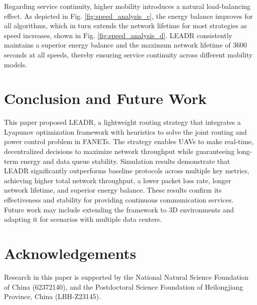 \documentclass[runningheads]{llncs}
\begin{document}
Regarding service continuity, higher mobility introduces a natural load-balancing effect.  As depicted in Fig. \ref{fig:speed_analysis_c}, the energy balance improves for all algorithms, which in turn extends the network lifetime for most strategies as speed increases, shown in Fig. \ref{fig:speed_analysis_d}. LEADR consistently maintains a superior energy balance and the maximum network lifetime of 3600 seconds at all speeds, thereby ensuring service continuity across different mobility models.

\section{Conclusion and Future Work}
\label{s6}
This paper proposed LEADR, a lightweight routing strategy that integrates a Lyapunov optimization framework with heuristics to solve the joint routing and power control problem in FANETs. The strategy enables UAVs to make real-time, decentralized decisions to maximize network throughput while guaranteeing long-term energy and data queue stability. Simulation results demonstrate that LEADR significantly outperforms baseline protocols across multiple key metrics, achieving higher total network throughput, a lower packet loss rate, longer network lifetime, and superior energy balance. These results confirm its effectiveness and stability for providing continuous communication services. Future work may include extending the framework to 3D environments and adapting it for scenarios with multiple data centers.

\section{Acknowledgements}
Research in this paper is supported by the National Natural Science Foundation of China (62372140), and the Postdoctoral Science Foundation of Heilongjiang Province, China (LBH-Z23145).



\end{document}
